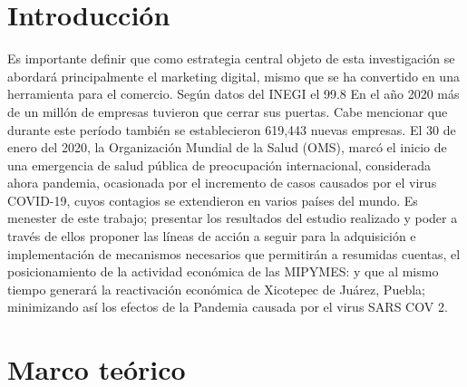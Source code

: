 \documentclass[12pt]{difu100cia} %
\begin{document}
\section{Introducción}
Es importante definir que como estrategia central objeto de esta investigación se abordará principalmente el marketing digital, mismo que se ha convertido en una herramienta para el comercio.
Según datos del INEGI el 99.8%
En el año 2020 más de un millón de empresas tuvieron que cerrar sus puertas. Cabe mencionar que durante este período también se establecieron 619,443 nuevas empresas.
El 30 de enero del 2020, la Organización Mundial de la Salud (OMS), marcó el inicio de una emergencia de salud pública de preocupación internacional, considerada ahora pandemia, ocasionada por el incremento de casos causados por el virus COVID-19, cuyos contagios se extendieron en varios países del mundo.
Es menester de este trabajo; presentar los resultados del estudio realizado y poder a través de ellos proponer las líneas de acción a seguir para la adquisición e implementación de mecanismos necesarios que permitirán a resumidas cuentas, el posicionamiento de la actividad económica de las MIPYMES: y que al mismo tiempo generará la reactivación económica de Xicotepec de Juárez, Puebla; minimizando así los efectos de la Pandemia causada por el virus SARS COV 2.


\section{Marco teórico}
\end{document}
